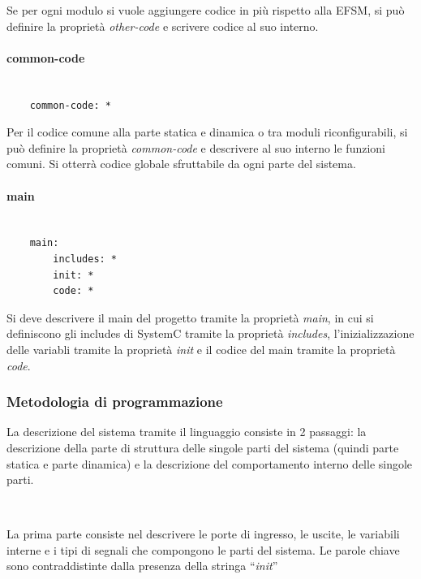 \documentclass[a4paper,titlepage]{book}
\begin{document}
Se per ogni modulo si vuole aggiungere codice in più rispetto alla EFSM, si può definire la proprietà \textit{other-code} e scrivere codice al suo interno.


\paragraph{common-code}

\begin{lstlisting}[frame=single]

	common-code: *

\end{lstlisting}

Per il codice comune alla parte statica e dinamica o tra moduli riconfigurabili, si può definire la proprietà \textit{common-code} e descrivere al suo interno le funzioni comuni. Si otterrà codice globale sfruttabile da ogni parte del sistema.


\paragraph{main}

\begin{lstlisting}[frame=single]

	main:
		includes: *
		init: *
		code: *

\end{lstlisting}


Si deve descrivere il main del progetto tramite la proprietà \textit{main}, in cui si definiscono gli includes di SystemC tramite la proprietà \textit{includes}, l'inizializzazione delle variabli tramite la proprietà \textit{init} e il codice del main tramite la proprietà \textit{code}.

\subsubsection{Metodologia di programmazione}

La descrizione del sistema tramite il linguaggio  consiste in 2 passaggi: la descrizione della parte di struttura delle singole parti del sistema (quindi parte statica e parte dinamica) e la descrizione del comportamento interno delle singole parti.

~ 

La prima parte consiste nel descrivere le porte di ingresso, le uscite, le variabili interne e i tipi di segnali che compongono le parti del sistema. Le parole chiave sono contraddistinte dalla presenza della stringa ``\textit{init}''
\end{document}
